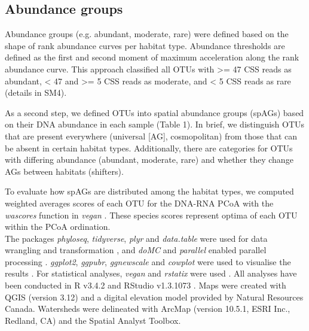 \documentclass[12pt,a4paper]{article} %
\begin{document}
\subsection*{Abundance groups}
Abundance groups (e.g. abundant, moderate, rare) were defined based on the shape of rank abundance curves per habitat type. Abundance thresholds are defined as the first and second moment of maximum acceleration along the rank abundance curve. This approach classified all OTUs with >= 47 CSS reads as abundant, < 47 and >= 5 CSS reads as moderate, and < 5 CSS reads as rare (details in SM4).

As a second step, we defined OTUs into spatial abundance groups (spAGs) based on their DNA abundance in each sample (Table 1). In brief, we distinguish OTUs that are present everywhere (universal [AG], cosmopolitan) from those that can be absent in certain habitat types. Additionally, there are categories for OTUs with differing abundance (abundant, moderate, rare) and whether they change AGs between habitats (shifters).

To evaluate how spAGs are distributed among the habitat types, we computed weighted averages scores of each OTU for the DNA-RNA PCoA with the \textit{wascores} function in \textit{vegan} \citep{Oksanen2017}. These species scores represent optima of each OTU within the PCoA ordination.\\[.3cm]

The packages \textit{phyloseq}, \textit{tidyverse}, \textit{plyr} and \textit{data.table} were used for data wrangling and transformation \citep{McMurdie2013,Wickham2019, Wickham2011, Dowle2019}, and \textit{doMC} and \textit{parallel} enabled parallel processing \citep{Analytics2019, RCoreTeam2017}. \textit{ggplot2}, \textit{ggpubr}, \textit{ggnewscale} and \textit{cowplot} were used to visualise the results \citep{Wickham2016, Kassambara2018, Campitelli2020, Wilke2019}. For statistical analyses, \textit{vegan} and \textit{rstatix} were used \citep{Oksanen2017, Kassambara2020}. All analyses have been conducted in R v3.4.2 \citep{RCoreTeam2017} and RStudio v1.3.1073 \citep{RStudioTeam2016}. Maps were created with QGIS (version 3.12) and a digital elevation model provided by Natural Resources Canada. Watersheds were delineated with ArcMap (version 10.5.1, ESRI Inc., Redland, CA) and the Spatial Analyst Toolbox.
\end{document}
